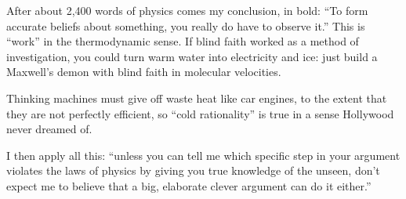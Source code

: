 After about 2,400 words of physics comes my conclusion, in bold: ``To form accurate beliefs about something, you really do have to observe it.'' This is ``work'' in the thermodynamic sense. If blind faith worked as a method of investigation, you could turn warm water into electricity and ice: just build a Maxwell's demon with blind faith in molecular velocities. 

Thinking machines must give off waste heat like car engines, to the extent that they are not perfectly efficient, so ``cold rationality'' is true in a sense Hollywood never dreamed of.

I then apply all this: ``unless you can tell me which specific step in your argument violates the laws of physics by giving you true knowledge of the unseen, don't expect me to believe that a big, elaborate clever argument can do it either.'' 
